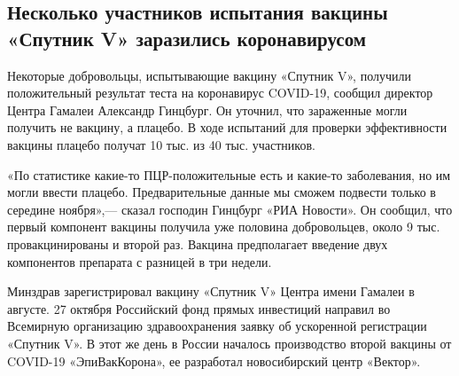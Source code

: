  
 
 
 
 
 
\subsection{Несколько участников испытания вакцины «Спутник V» заразились коронавирусом}
\label{sec:28_10_2020.news.ru.kommersant.1.sputniv_v_zarazhenije_koronavirus}


Некоторые добровольцы, испытывающие вакцину «Спутник V», получили положительный
результат теста на коронавирус COVID-19, сообщил директор Центра Гамалеи
Александр Гинцбург. Он уточнил, что зараженные могли получить не вакцину, а
плацебо. В ходе испытаний для проверки эффективности вакцины плацебо получат 10
тыс. из 40 тыс. участников.

«По статистике какие-то ПЦР-положительные есть и какие-то заболевания, но им
могли ввести плацебо. Предварительные данные мы сможем подвести только в
середине ноября»,— сказал господин Гинцбург «РИА Новости». Он сообщил, что
первый компонент вакцины получила уже половина добровольцев, около 9 тыс.
провакцинированы и второй раз. Вакцина предполагает введение двух компонентов
препарата с разницей в три недели.

Минздрав зарегистрировал вакцину «Спутник V» Центра имени Гамалеи в августе. 27
октября Российский фонд прямых инвестиций направил во Всемирную организацию
здравоохранения заявку об ускоренной регистрации «Спутник V». В этот же день в
России началось производство второй вакцины от COVID-19 «ЭпиВакКорона», ее
разработал новосибирский центр «Вектор».
